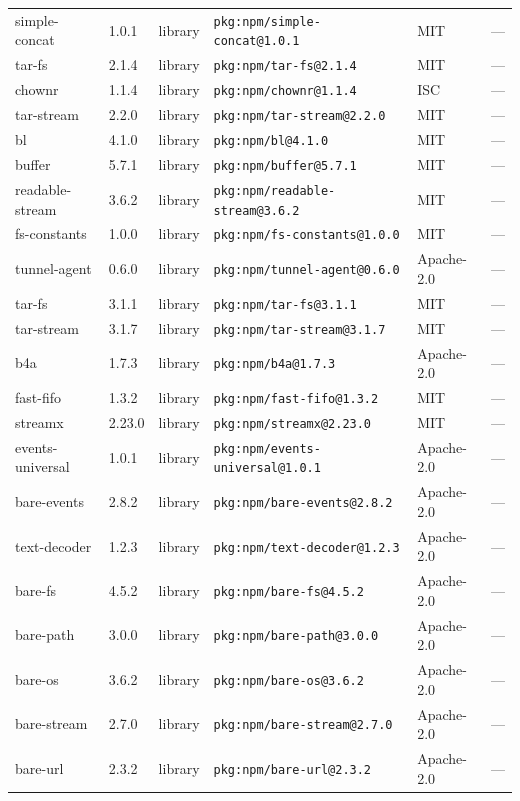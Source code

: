 \documentclass[11pt]{article}
\begin{document}
\begin{longtable}{|l|l|l|p{2.2cm}|l|p{4cm}|}
simple-concat & 1.0.1 & library & \texttt{pkg:npm/simple-concat@1.0.1} & MIT & — \\
tar-fs & 2.1.4 & library & \texttt{pkg:npm/tar-fs@2.1.4} & MIT & — \\
chownr & 1.1.4 & library & \texttt{pkg:npm/chownr@1.1.4} & ISC & — \\
tar-stream & 2.2.0 & library & \texttt{pkg:npm/tar-stream@2.2.0} & MIT & — \\
bl & 4.1.0 & library & \texttt{pkg:npm/bl@4.1.0} & MIT & — \\
buffer & 5.7.1 & library & \texttt{pkg:npm/buffer@5.7.1} & MIT & — \\
readable-stream & 3.6.2 & library & \texttt{pkg:npm/readable-stream@3.6.2} & MIT & — \\
fs-constants & 1.0.0 & library & \texttt{pkg:npm/fs-constants@1.0.0} & MIT & — \\
tunnel-agent & 0.6.0 & library & \texttt{pkg:npm/tunnel-agent@0.6.0} & Apache-2.0 & — \\
tar-fs & 3.1.1 & library & \texttt{pkg:npm/tar-fs@3.1.1} & MIT & — \\
tar-stream & 3.1.7 & library & \texttt{pkg:npm/tar-stream@3.1.7} & MIT & — \\
b4a & 1.7.3 & library & \texttt{pkg:npm/b4a@1.7.3} & Apache-2.0 & — \\
fast-fifo & 1.3.2 & library & \texttt{pkg:npm/fast-fifo@1.3.2} & MIT & — \\
streamx & 2.23.0 & library & \texttt{pkg:npm/streamx@2.23.0} & MIT & — \\
events-universal & 1.0.1 & library & \texttt{pkg:npm/events-universal@1.0.1} & Apache-2.0 & — \\
bare-events & 2.8.2 & library & \texttt{pkg:npm/bare-events@2.8.2} & Apache-2.0 & — \\
text-decoder & 1.2.3 & library & \texttt{pkg:npm/text-decoder@1.2.3} & Apache-2.0 & — \\
bare-fs & 4.5.2 & library & \texttt{pkg:npm/bare-fs@4.5.2} & Apache-2.0 & — \\
bare-path & 3.0.0 & library & \texttt{pkg:npm/bare-path@3.0.0} & Apache-2.0 & — \\
bare-os & 3.6.2 & library & \texttt{pkg:npm/bare-os@3.6.2} & Apache-2.0 & — \\
bare-stream & 2.7.0 & library & \texttt{pkg:npm/bare-stream@2.7.0} & Apache-2.0 & — \\
bare-url & 2.3.2 & library & \texttt{pkg:npm/bare-url@2.3.2} & Apache-2.0 & — \\

\end{longtable}
\end{document}
